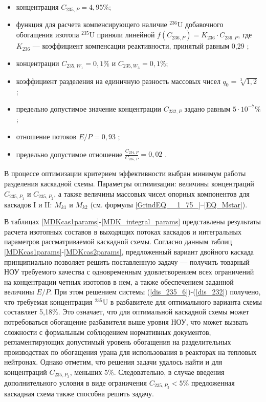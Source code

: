 \begin{itemize}
    \item концентрация $C_{235,{P}} = {4,95\%}$; 
    \item функция для расчета компенсирующего наличие $^{236}$U добавочного обогащения изотопа $^{235}$U приняли линейной $f(C_{236,P}) = {K_{236}\cdot{C_{236,{P}}}}$, где $K_{236}$ --- коэффициент компенсации реактивности, принятый равным 0,29 \cite{smirnovEvolutionIsotopicComposition2012};
    \item концентрации $C_{235,{W_1}} = 0,1\%$ и $C_{235,{W_3}} = 0,1\%$;
    \item коэффициент разделения на единичную разность массовых чисел $q_{0} = \sqrt[3]{1,2}$ \cite{smirnovEvolutionIsotopicComposition2012};
    \item предельно допустимое значение концентрации $C_{232,{P}}$ задано равным $5\cdot10^{-7} \%$;
    \item отношение потоков $E/P = 0,93$ \cite{smirnovObogashchenieRegenerirovannogoUrana2018};
    \item предельно допустимое отношение $\frac{C_{234,{P}}}{C_{235,{P}}} = 0,02$ \cite{smirnovObogashchenieRegenerirovannogoUrana2018}. 
\end{itemize}

В процессе оптимизации критерием эффективности выбран минимум работы разделения каскадной схемы. Параметры оптимизации: величины концентраций $C_{235,{P_1}}$ и $C_{235,{P_2}}$, а также величины массовых чисел опорных компонентов для каскадов I и II: $M_{k1}$ и $M_{k2}$ (см. формулы \ref{GrindEQ__1_75_}--\ref{EQ_Mstar}). 

В таблицах \ref{MDKcas1params}-\ref{MDK_integral_params} представлены результаты расчета изотопных составов в выходящих потоках каскадов и интегральных параметров рассматриваемой каскадной схемы. Согласно данным таблиц \ref{MDKcas1params}-\ref{MDKcas2params}, предложенный вариант двойного каскада принципиально позволяет решить поставленную задачу --- получить товарный НОУ требуемого качества с одновременным удовлетворением всех ограничений на концентрации четных изотопов в нем, а также обеспечением заданной величины $E/P$. При этом решением системы (\ref{dis_235_6})-(\ref{dis_232}) получено, что требуемая концентрация $^{235}$U в разбавителе для оптимального варианта схемы составляет 5,18\%. Это означает, что для оптимальной каскадной схемы может потребоваться обогащение разбавителя выше уровня НОУ, что может вызвать сложности с формальным соблюдением нормативных документов, регламентирующих допустимый уровень обогащения на разделительных производствах по обогащения урана для использования в реакторах на тепловых нейтронах. Однако отметим, что решения задачи удалось найти и для концентраций $C_{235,{P_3}}$, меньших 5\%. Следовательно, в случае введения дополнительного условия в виде ограничения $C_{235,{P_3}} < 5\%$ предложенная каскадная схема также способна решить задачу. 

